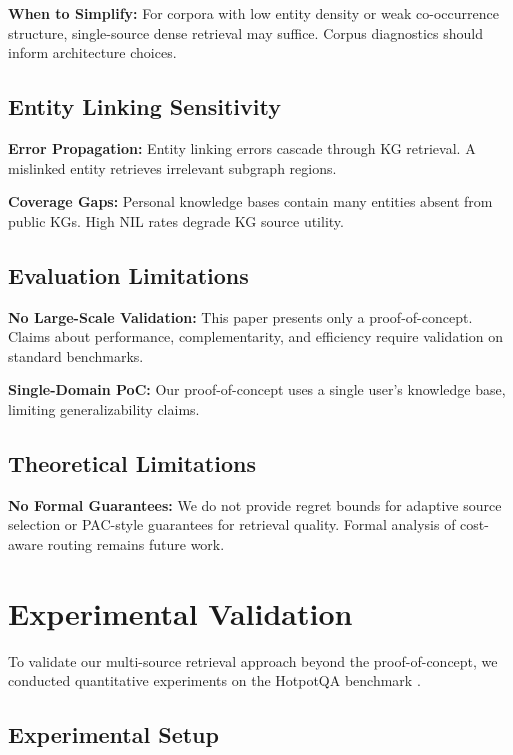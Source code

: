 \documentclass[11pt,a4paper]{article}
\begin{document}
\textbf{When to Simplify:} For corpora with low entity density or weak co-occurrence structure, single-source dense retrieval may suffice. Corpus diagnostics should inform architecture choices.

\subsection{Entity Linking Sensitivity}

\textbf{Error Propagation:} Entity linking errors cascade through KG retrieval. A mislinked entity retrieves irrelevant subgraph regions.

\textbf{Coverage Gaps:} Personal knowledge bases contain many entities absent from public KGs. High NIL rates degrade KG source utility.

\subsection{Evaluation Limitations}

\textbf{No Large-Scale Validation:} This paper presents only a proof-of-concept. Claims about performance, complementarity, and efficiency require validation on standard benchmarks.

\textbf{Single-Domain PoC:} Our proof-of-concept uses a single user's knowledge base, limiting generalizability claims.

\subsection{Theoretical Limitations}

\textbf{No Formal Guarantees:} We do not provide regret bounds for adaptive source selection or PAC-style guarantees for retrieval quality. Formal analysis of cost-aware routing remains future work.

\section{Experimental Validation}
\label{sec:experiments}

To validate our multi-source retrieval approach beyond the proof-of-concept, we conducted quantitative experiments on the HotpotQA benchmark \citep{yang2018hotpotqa}.

\subsection{Experimental Setup}
\end{document}
